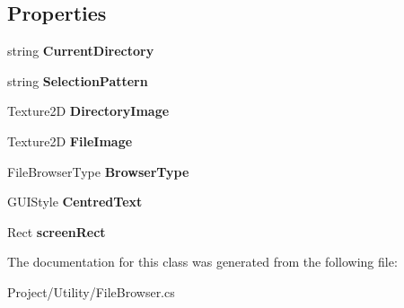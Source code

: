 \subsection*{Properties}
\begin{DoxyCompactItemize}
\item 
\mbox{\label{class_lerp2_a_p_i_1_1_utility_1_1_file_browser_a13ab9edf83c7ee4b91547f042a6992ce}} 
string {\bfseries Current\+Directory}
\item 
\mbox{\label{class_lerp2_a_p_i_1_1_utility_1_1_file_browser_a738b0c6ce363d00f70f18e700023822f}} 
string {\bfseries Selection\+Pattern}
\item 
\mbox{\label{class_lerp2_a_p_i_1_1_utility_1_1_file_browser_a51b0685a6c48727878eeb16fe81ff065}} 
Texture2D {\bfseries Directory\+Image}
\item 
\mbox{\label{class_lerp2_a_p_i_1_1_utility_1_1_file_browser_a63c81cbca43f8e383a17f9bf26924779}} 
Texture2D {\bfseries File\+Image}
\item 
\mbox{\label{class_lerp2_a_p_i_1_1_utility_1_1_file_browser_aed8a52cae6780a987340e6b6f9863aec}} 
File\+Browser\+Type {\bfseries Browser\+Type}
\item 
\mbox{\label{class_lerp2_a_p_i_1_1_utility_1_1_file_browser_ad206161de3d10e4df0b00c051a4916a3}} 
G\+U\+I\+Style {\bfseries Centred\+Text}
\item 
\mbox{\label{class_lerp2_a_p_i_1_1_utility_1_1_file_browser_a7aca10f30a0eb27e99843f92b5de6be1}} 
Rect {\bfseries screen\+Rect}
\end{DoxyCompactItemize}


The documentation for this class was generated from the following file\+:\begin{DoxyCompactItemize}
\item 
Project/\+Utility/File\+Browser.\+cs\end{DoxyCompactItemize}
